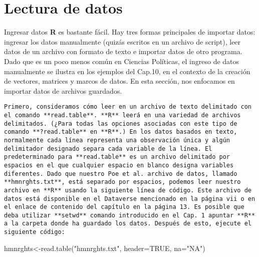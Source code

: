 \documentclass[
]{book}
\newenvironment{Shaded}{\begin{snugshade}}{\end{snugshade}}
\newcommand{\AttributeTok}[1]{\textcolor[rgb]{0.77,0.63,0.00}{#1}}
\newcommand{\ConstantTok}[1]{\textcolor[rgb]{0.00,0.00,0.00}{#1}}
\newcommand{\FunctionTok}[1]{\textcolor[rgb]{0.00,0.00,0.00}{#1}}
\newcommand{\NormalTok}[1]{#1}
\newcommand{\OtherTok}[1]{\textcolor[rgb]{0.56,0.35,0.01}{#1}}
\newcommand{\StringTok}[1]{\textcolor[rgb]{0.31,0.60,0.02}{#1}}
\begin{document}
\hypertarget{lectura-de-datos}{%
\section*{Lectura de datos}\label{lectura-de-datos}}

Ingresar datos \textbf{R} es bastante fácil. Hay tres formas principales de importar datos: ingresar los datos manualmente (quizás escritos en un archivo de script), leer datos de un archivo con formato de texto e importar datos de otro programa. Dado que es un poco menos común en Ciencias Políticas, el ingreso de datos manualmente se ilustra en los ejemplos del Cap.10, en el contexto de la creación de vectores, matrices y marcos de datos. En esta sección, nos enfocamos en importar datos de archivos guardados.

\begin{verbatim}
Primero, consideramos cómo leer en un archivo de texto delimitado con el comando **read.table**. **R** leerá en una variedad de archivos delimitados. (¿Para todas las opciones asociadas con este tipo de comando **?read.table** en **R**.) En los datos basados en texto, normalmente cada línea representa una observación única y algún delimitador designado separa cada variable de la línea. El predeterminado para **read.table** es un archivo delimitado por espacios en el que cualquier espacio en blanco designa variables diferentes. Dado que nuestro Poe et al. archivo de datos, llamado **hmnrghts.txt**, está separado por espacios, podemos leer nuestro archivo en **R** usando la siguiente línea de código. Este archivo de datos está disponible en el Dataverse mencionado en la página vii o en el enlace de contenido del capítulo en la página 13. Es posible que deba utilizar **setwd** comando introducido en el Cap. 1 apuntar **R** a la carpeta donde ha guardado los datos. Después de esto, ejecute el siguiente código:
\end{verbatim}

\begin{Shaded}
\begin{Highlighting}[]
\NormalTok{hmnrghts}\OtherTok{\textless{}{-}}\FunctionTok{read.table}\NormalTok{(}\StringTok{"hmnrghts.txt"}\NormalTok{,}
    \AttributeTok{header=}\ConstantTok{TRUE}\NormalTok{, }\AttributeTok{na=}\StringTok{"NA"}\NormalTok{)}
\end{Highlighting}
\end{Shaded}
\end{document}
